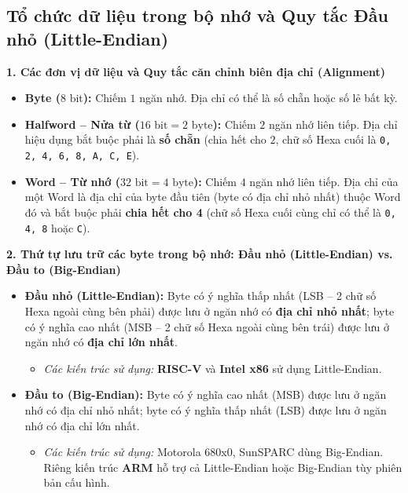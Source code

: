 \subsection{Tổ chức dữ liệu trong bộ nhớ và Quy tắc Đầu nhỏ (Little-Endian)}

\textbf{1. Các đơn vị dữ liệu và Quy tắc căn chỉnh biên địa chỉ (Alignment)}
\begin{itemize}
    \item \textbf{Byte ($8\text{ bit}$):} Chiếm $1$ ngăn nhớ. Địa chỉ có thể là số chẵn hoặc số lẻ bất kỳ.
    \item \textbf{Halfword -- Nửa từ ($16\text{ bit} = 2\text{ byte}$):} Chiếm $2$ ngăn nhớ liên tiếp. Địa chỉ hiệu dụng bắt buộc phải là \textbf{số chẵn} (chia hết cho $2$, chữ số Hexa cuối là \texttt{0, 2, 4, 6, 8, A, C, E}).
    \item \textbf{Word -- Từ nhớ ($32\text{ bit} = 4\text{ byte}$):} Chiếm $4$ ngăn nhớ liên tiếp. Địa chỉ của một Word là địa chỉ của byte đầu tiên (byte có địa chỉ nhỏ nhất) thuộc Word đó và bắt buộc phải \textbf{chia hết cho 4} (chữ số Hexa cuối cùng chỉ có thể là \texttt{0, 4, 8} hoặc \texttt{C}).
\end{itemize}

\textbf{2. Thứ tự lưu trữ các byte trong bộ nhớ: Đầu nhỏ (Little-Endian) vs. Đầu to (Big-Endian)}
\begin{itemize}
    \item \textbf{Đầu nhỏ (Little-Endian):} Byte có ý nghĩa thấp nhất (LSB -- 2 chữ số Hexa ngoài cùng bên phải) được lưu ở ngăn nhớ có \textbf{địa chỉ nhỏ nhất}; byte có ý nghĩa cao nhất (MSB -- 2 chữ số Hexa ngoài cùng bên trái) được lưu ở ngăn nhớ có \textbf{địa chỉ lớn nhất}.
    \begin{itemize}
        \item \textit{Các kiến trúc sử dụng:} \textbf{RISC-V} và \textbf{Intel x86} sử dụng Little-Endian.
    \end{itemize}
    \item \textbf{Đầu to (Big-Endian):} Byte có ý nghĩa cao nhất (MSB) được lưu ở ngăn nhớ có địa chỉ nhỏ nhất; byte có ý nghĩa thấp nhất (LSB) được lưu ở ngăn nhớ có địa chỉ lớn nhất.
    \begin{itemize}
        \item \textit{Các kiến trúc sử dụng:} Motorola 680x0, SunSPARC dùng Big-Endian. Riêng kiến trúc \textbf{ARM} hỗ trợ cả Little-Endian hoặc Big-Endian tùy phiên bản cấu hình.
    \end{itemize}
\end{itemize}

